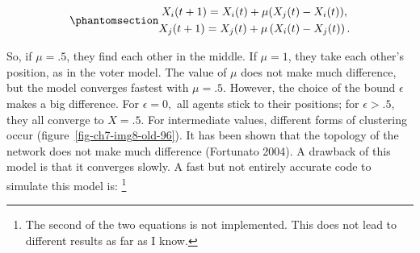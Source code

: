 \documentclass[
  a4paper,
  DIV=11,
  numbers=noendperiod,
  oneside]{scrreprt}
\begin{document}
\begin{equation}\phantomsection\label{eq-ch7-2-old-51}{
\begin{gathered}
X_{i}(t + 1) = X_{i}(t) + \mu(X_{j}(t) - X_{i}(t)),\\
X_{j}(t + 1) = X_{j}(t) + \mu\left( X_{i}(t) - X_{j}(t) \right).
\end{gathered}
}\end{equation}

So, if \(\mu = .5\), they find each other in the middle. If \(\mu = 1\),
they take each other's position, as in the voter model. The value of
\(\mu\) does not make much difference, but the model converges fastest
with \(\mu = .5\). However, the choice of the bound \(\epsilon\) makes a
big difference. For \(\epsilon = 0,\) all agents stick to their
positions; for \(\epsilon > .5\), they all converge to \(X = .5\). For
intermediate values, different forms of clustering occur
(figure~\ref{fig-ch7-img8-old-96}). It has been shown that the topology
of the network does not make much difference (Fortunato 2004). A
drawback of this model is that it converges slowly. A fast but not
entirely accurate code to simulate this model is: \footnote{The second
  of the two equations is not implemented. This does not lead to
  different results as far as I know.}
\end{document}
